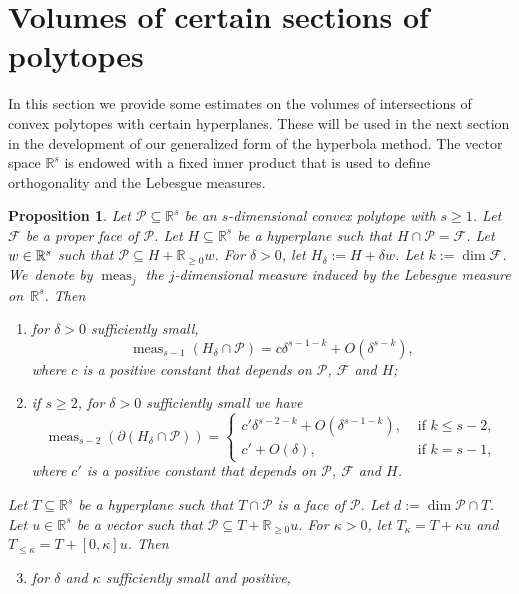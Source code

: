 \documentclass[JEP,XML,SOM,Unicode,published]{cedram}
\newenvironment{enumeratei}
{\bgroup\def\theenumi{\roman{enumi}}\def\theenumii{\arabic{enumii}}\begin{enumerate}}
{\end{enumerate}\egroup}
\newcommand\RR{\mathbb{R}}
\DeclareMathOperator{\meas}{meas}
\newtheorem{prop}[theorem]{Proposition}
\theoremstyle{definition}
\numberwithin{theorem}{section}
\begin{document}
\section{Volumes of certain sections of polytopes}
\label{sec:volume_section_polytope}
In this section we provide some estimates on the volumes of intersections
of convex polytopes with certain hyperplanes.
These will be used in the next section in the development of our generalized form of the hyperbola method.
The vector space $\RR^s$ is endowed with a fixed inner product that is used to define orthogonality and the Lebesgue measures.

\begin{prop}
\label{prop:volume_section_polytope}
Let $\mathcal P\subseteq \RR^s$ be an $s$-dimensional convex polytope with $s\geq1$.
Let~$\mathcal F$ be a proper face of $\mathcal P$.
Let $H\subseteq\RR^s$ be a hyperplane such that $H\cap \mathcal P=\mathcal F$.
Let~$w\in\nobreak\RR^s$ such that $\mathcal P\subseteq H+\RR_{\geq0}w$.
For $\delta> 0$, let $H_\delta:=H+\delta w$. Let $k:=\dim \mathcal F$.
We~denote by $\meas_j$ the $j$-dimensional measure
induced by the Lebesgue measure on~$\RR^s$. Then
\begin{enumeratei}
\item
\label{item:volume_s-1}
for $\delta>0$ sufficiently small,
\[
\meas_{s-1} (H_\delta \cap \mathcal P)=
c \delta^{s-1-k}+O(\delta^{s-k}),
\]
where $c$ is a positive constant that depends on $\mathcal P$, $\mathcal F$ and $H$;
\item
\label{item:volume_boundary}
if $s\geq 2$, for $\delta>0$ sufficiently small we have
\[
\meas_{s-2} (\partial(H_\delta \cap \mathcal P))= \begin{cases}
c' \delta^{s-2-k}+O(\delta^{s-1-k}), & \text{ if } k\leq s-2,\\
c' +O(\delta), & \text{ if } k= s-1,
\end{cases}
\]
where $c'$ is a positive constant that depends on $\mathcal P$, $\mathcal F$ and $H$.
\end{enumeratei}
Let $T\subseteq \RR^s$ be a hyperplane such that $T\cap \mathcal P$ is a face of $\mathcal P$. Let $d:=\dim\mathcal P\cap T$.
Let $u\in\RR^s$ be a vector such that $\mathcal P\subseteq T+\RR_{\geq0}u$.
For $\kappa>0$, let $T_\kappa=T+{\kappa}u$ and $T_{\leq\kappa}=T+[0,\kappa] u$. Then
\begin{enumeratei}\setcounter{enumi}{2}
\item
\label{item:volume_s-1_kappa}
for $\delta$ and $\kappa$ sufficiently small and positive,
\[
\]
\end{enumeratei}
\end{prop}
\end{document}
